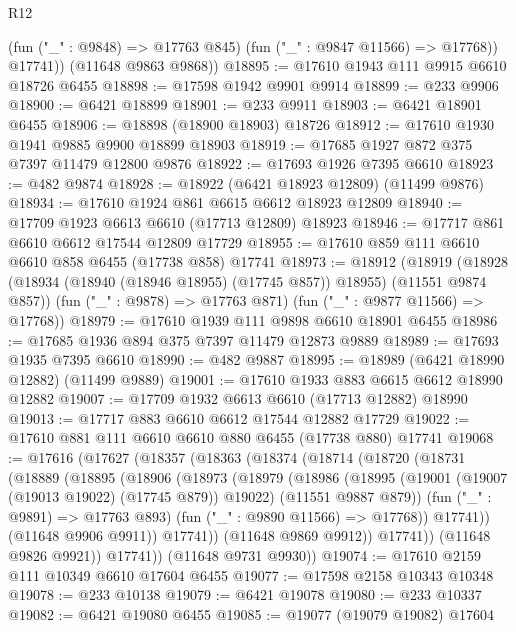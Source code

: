 \begin{lexlean}{R12}
\begin{coremodule}
{{{{{{{{{{{{{{{{{{{{{{{{{{{{{{{{{{{{{{{{{{{{{{{{{{{{{{{{{{{{{{{{{{{{{{{{{{{{{{{{{{            (fun ("_" : @9848) => @17763 @845)
            (fun ("_" : @9847 @11566) => @17768))
          @17741))
      (@11648 @9863 @9868))
@18895 := @17610 @1943 @111 @9915 @6610 @18726 @6455
@18898 := @17598 @1942 @9901 @9914
@18899 := @233 @9906
@18900 := @6421 @18899
@18901 := @233 @9911
@18903 := @6421 @18901 @6455
@18906 := @18898 (@18900 @18903) @18726
@18912 := @17610 @1930 @1941 @9885 @9900 @18899 @18903
@18919 := @17685 @1927 @872 @375 @7397 @11479 @12800 @9876
@18922 := @17693 @1926 @7395 @6610
@18923 := @482 @9874
@18928 := @18922 (@6421 @18923 @12809) (@11499 @9876)
@18934 := @17610 @1924 @861 @6615 @6612 @18923 @12809
@18940 := @17709 @1923 @6613 @6610 (@17713 @12809) @18923
@18946 := @17717 @861 @6610 @6612 @17544 @12809 @17729
@18955 := @17610 @859 @111 @6610 @6610 @858 @6455 (@17738 @858) @17741
@18973 := @18912
    (@18919
      (@18928 (@18934 (@18940 (@18946 @18955) (@17745 @857)) @18955) (@11551 @9874 @857))
      (fun ("_" : @9878) => @17763 @871)
      (fun ("_" : @9877 @11566) => @17768))
@18979 := @17610 @1939 @111 @9898 @6610 @18901 @6455
@18986 := @17685 @1936 @894 @375 @7397 @11479 @12873 @9889
@18989 := @17693 @1935 @7395 @6610
@18990 := @482 @9887
@18995 := @18989 (@6421 @18990 @12882) (@11499 @9889)
@19001 := @17610 @1933 @883 @6615 @6612 @18990 @12882
@19007 := @17709 @1932 @6613 @6610 (@17713 @12882) @18990
@19013 := @17717 @883 @6610 @6612 @17544 @12882 @17729
@19022 := @17610 @881 @111 @6610 @6610 @880 @6455 (@17738 @880) @17741
@19068 := @17616
    (@17627
      (@18357
        (@18363
          (@18374
            (@18714
              (@18720
                (@18731
                  (@18889
                    (@18895
                      (@18906
                        (@18973
                          (@18979
                            (@18986
                              (@18995
                                (@19001 (@19007 (@19013 @19022) (@17745 @879)) @19022)
                                (@11551 @9887 @879))
                              (fun ("_" : @9891) => @17763 @893)
                              (fun ("_" : @9890 @11566) => @17768))
                            @17741))
                        (@11648 @9906 @9911))
                      @17741))
                  (@11648 @9869 @9912))
                @17741))
            (@11648 @9826 @9921))
          @17741))
      (@11648 @9731 @9930))
@19074 := @17610 @2159 @111 @10349 @6610 @17604 @6455
@19077 := @17598 @2158 @10343 @10348
@19078 := @233 @10138
@19079 := @6421 @19078
@19080 := @233 @10337
@19082 := @6421 @19080 @6455
@19085 := @19077 (@19079 @19082) @17604
}}}}}}}}}}}}}}}}}}}}}}}}}}}}}}}}}}}}}}}}}}}}}}}}}}}}}}}}}}}}}}}}}}}}}}}}}}}}}}}}}}
\end{coremodule}
\end{lexlean}
